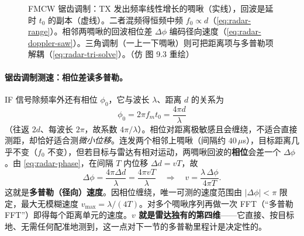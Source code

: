 \begin{figure}[ht]
\centering
{}
\caption{FMCW 锯齿调制：TX 发出频率线性增长的啁啾（实线），回波是延时 $t_0$ 的副本（虚线）。二者混频得恒频中频 $f_0\propto d$（\cref{eq:radar-range}）。相邻两啁啾的回波相位差 $\Delta\phi$ 编码径向速度（\cref{eq:radar-doppler-saw}）。三角调制（一上一下啁啾）则可把距离项与多普勒项解耦（\cref{eq:radar-tri-solve}）。（仿 \cite{carlone2026handbook} 图 9.3 重绘）}
\label{fig:radar-fmcw}
\end{figure}

\paragraph{锯齿调制测速：相位差读多普勒。}
IF 信号除频率外还有相位 $\phi_0$，它与波长 $\lambda$、距离 $d$ 的关系为
\begin{equation}
  \phi_0=2\pi f_m t_0=\frac{4\pi d}{\lambda}
  \label{eq:radar-phase}
\end{equation}
（往返 $2d$、每波长 $2\pi$，故系数 $4\pi/\lambda$）。相位对距离极敏感且会缠绕，不适合直接测距，却恰好适合测\emph{微小位移}。连发两个相邻上啁啾（间隔约 $40\,\mu$s），目标距离几乎不变（$f_0$ 不变），但若目标与雷达有相对运动，两啁啾回波的\textbf{相位}会差一个 $\Delta\phi$。由 \cref{eq:radar-phase}，在间隔 $T$ 内位移 $\Delta d=vT$，故
\begin{equation}
  \Delta\phi=\frac{4\pi\Delta d}{\lambda}=\frac{4\pi vT}{\lambda}
  \quad\Longrightarrow\quad
  v=\frac{\lambda\,\Delta\phi}{4\pi T}.
  \label{eq:radar-doppler-saw}
\end{equation}
这就是\textbf{多普勒（径向）速度}。因相位缠绕，唯一可测的速度范围由 $|\Delta\phi|<\pi$ 限定，最大无模糊速度 $v_{\max}=\lambda/(4T)$。对多个啁啾序列再做一次 FFT（“多普勒 FFT”）即得每个距离单元的速度。\textbf{$v$ 就是雷达独有的第四维}——它直接、按目标地、无需任何配准地测到，这一点对下一节的多普勒里程计是决定性的。

